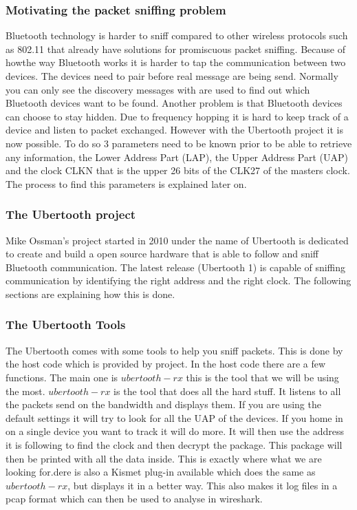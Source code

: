 \subsubsection{Motivating the packet sniffing problem}
Bluetooth technology is harder to sniff compared to other wireless protocols such as 802.11 that already have solutions for promiscuous packet sniffing. Because of howthe way Bluetooth works it is harder to tap the communication between two devices. The devices need to pair before real message are being send. Normally you can only see the discovery messages with are used to find out which Bluetooth devices want to be found. Another problem is that Bluetooth devices can choose to stay hidden.
Due to frequency hopping it is hard to keep track of a device and listen to packet exchanged. However with the Ubertooth project it is now possible. To do so 3 parameters need to be known prior to be able to retrieve any information, the Lower Address Part (LAP), the Upper Address Part (UAP) and the clock CLKN that is the upper 26 bits of the CLK27 of the masters clock. The process to find this parameters is explained later on.

\subsubsection{The Ubertooth project}
\label{subsubsec:ubertooth}
Mike Ossman's project  started in 2010 under the name of Ubertooth is dedicated to create and build a open source hardware that is able to follow and sniff Bluetooth communication. The latest release (Ubertooth 1) is capable of sniffing communication by identifying the right address and the right clock. The following sections are explaining how this is done.

\subsubsection{The Ubertooth Tools}
\label{subsubsec:ubertooth_tools}
The Ubertooth comes with some tools to help you sniff packets. This is done by the host code which is provided by project. In the host code there are a few functions. The main one is $ubertooth-rx$ this is the tool that we will be using the most. $ubertooth-rx$ is the tool that does all the hard stuff. It listens to all the packets send on the bandwidth and displays them. If you are using the default settings it will try to look for all the UAP of the devices. If you home in on a single device you want to track it will do more. It will then use the address it is following to find the clock and then decrypt the package. This package will then be printed with all the data inside. This is exactly where what we are looking for.dere is also a Kismet plug-in available which does the same as $ubertooth-rx$, but displays it in a better way. This also makes it log files in a pcap format which can then be used to analyse in wireshark. 

